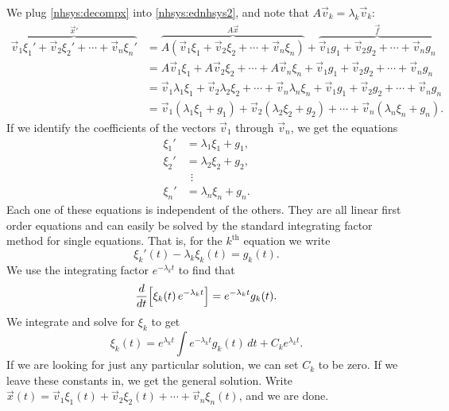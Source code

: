 \documentclass{ximera}
\begin{document}
We plug \eqref{nhsys:decompx} into \eqref{nhsys:ednhsys2}, and note that $A \vec{v}_k = \lambda_k \vec{v}_k$:
\begin{equation*}
    \begin{split}
        \overbrace{ \vec{v}_1 \xi_1' + \vec{v}_2 \xi_2' + \cdots + \vec{v}_n \xi_n' }^{{\vec{x}}'}
        & = \overbrace{ A \left( \vec{v}_1 \xi_1 +  \vec{v}_2 \xi_2 + \cdots + \vec{v}_n \xi_n \right) }^{A\vec{x}} + \overbrace{ \vec{v}_1 g_1 +  \vec{v}_2 g_2 + \cdots + \vec{v}_n g_n }^{\vec{f}} \\
        & = A \vec{v}_1 \xi_1 + A \vec{v}_2 \xi_2 + \cdots + A \vec{v}_n \xi_n + \vec{v}_1 g_1 + \vec{v}_2 g_2 + \cdots + \vec{v}_n g_n \\
        & = \vec{v}_1 \lambda_1 \xi_1 + \vec{v}_2 \lambda_2 \xi_2 + \cdots + \vec{v}_n \lambda_n \xi_n + \vec{v}_1 g_1 + \vec{v}_2 g_2 + \cdots + \vec{v}_n g_n \\
        & = \vec{v}_1 ( \lambda_1 \xi_1 + g_1 ) + \vec{v}_2 ( \lambda_2 \xi_2 + g_2 ) + \cdots + \vec{v}_n ( \lambda_n \xi_n + g_n ) .
    \end{split}
\end{equation*}
If we identify the coefficients of the vectors $\vec{v}_1$ through $\vec{v}_n$, we get the equations
\begin{align*}
    \xi_1' & = \lambda_1 \xi_1 + g_1 , \\
    \xi_2' & = \lambda_2 \xi_2 + g_2 , \\
    & ~~ \vdots \\
    \xi_n' & = \lambda_n \xi_n + g_n .
\end{align*}
Each one of these equations is independent of the others.  They are all linear first order equations and can easily be solved by the standard integrating factor method for single equations. That is, for the $k^{\text{th}}$ equation we write
\begin{equation*}
    \xi_k'(t) - \lambda_k \xi_k(t) = g_k(t) .
\end{equation*}
We use the integrating factor $e^{-\lambda_k t}$ to find that
\begin{equation*}
    \frac{d}{dt}\Bigl[ \xi_k(t) \, e^{-\lambda_k t} \Bigr] =  e^{-\lambda_k t} g_k(t) .
\end{equation*}
We integrate and solve for $\xi_k$ to get
\begin{equation*}
    \xi_k(t) =  e^{\lambda_k t} \int e^{-\lambda_k t} g_k(t) \,dt + C_k e^{\lambda_k t} .
\end{equation*}
If we are looking for just any particular solution, we can set $C_k$ to be zero.  If we leave these constants in, we get the general solution.  Write $\vec{x}(t) = \vec{v}_1 \xi_1(t) +  \vec{v}_2 \xi_2(t) + \cdots + \vec{v}_n \xi_n(t)$, and we are done.
\end{document}
